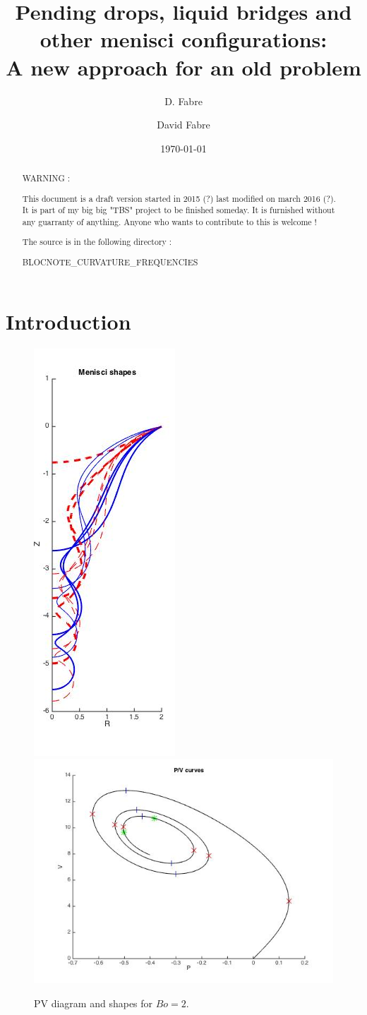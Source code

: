 \documentclass{jfm}
\title[Equilibrium and stability of pending drops and liquid bridges]{Pending drops, liquid bridges and other menisci configurations: \\  A new approach for an old problem}
\author{D. Fabre}
\author%
{
David Fabre
}
\date{\today}
\begin{document}
\maketitle

\tableofcontents



\begin{abstract}

WARNING :

This document is a draft version started in 2015 (?) last modified on march 2016 (?). It is part of my big big "TBS" project to be finished someday. 
It is furnished without any guarranty of anything. Anyone who wants to contribute to this is welcome !

The source is in the following directory :

BLOCNOTE\_CURVATURE\_FREQUENCIES


\end{abstract}


\section{Introduction}

\begin{figure}
\begin{center}
\includegraphics[width=.2\linewidth]{Shapes_Bo2.jpg}
\includegraphics[width=.6\linewidth]{PV_Bo2.jpg}
\end{center}
\caption{PV diagram and shapes for $Bo = 2$.}
\end{figure}
\end{document}
